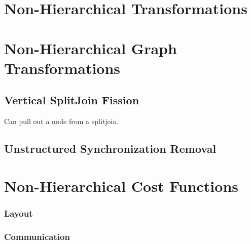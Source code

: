 \section{Non-Hierarchical  Transformations}

\section{Non-Hierarchical Graph Transformations}

\subsection{Vertical SplitJoin Fission}

Can pull out a node from a splitjoin.

\subsection{}

\subsection{Unstructured Synchronization Removal}


\section{Non-Hierarchical Cost Functions}

\subsubsection{Layout}

\subsubsection{Communication}




